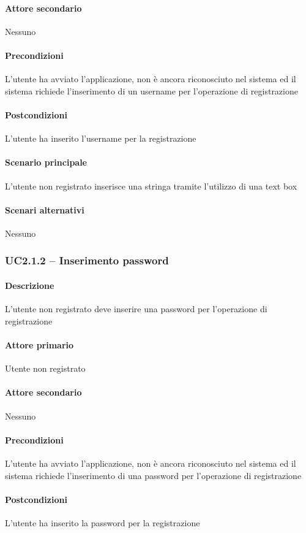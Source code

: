 \paragraph{Attore secondario}  Nessuno
\paragraph{Precondizioni}  L’utente ha avviato l’applicazione, non è ancora riconosciuto nel sistema ed il sistema richiede l’inserimento di un username per l’operazione di registrazione
\paragraph{Postcondizioni}  L’utente ha inserito l’username per la registrazione
\paragraph{Scenario principale}  
L’utente non registrato inserisce una stringa tramite l’utilizzo di una text box
\paragraph{Scenari alternativi}  Nessuno


\subsubsection{UC2.1.2 – Inserimento password}
\paragraph{Descrizione}  L’utente non registrato deve inserire una password per l’operazione di registrazione
\paragraph{Attore primario}  Utente non registrato
\paragraph{Attore secondario}  Nessuno
\paragraph{Precondizioni}  L’utente ha avviato l’applicazione, non è ancora riconosciuto nel sistema ed il sistema richiede l’inserimento di una password per l’operazione di registrazione
\paragraph{Postcondizioni}  L’utente ha inserito la password per la registrazione
